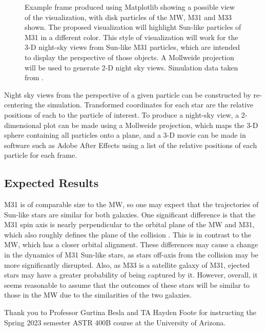 \documentclass[twocolumn]{aastex631}
\begin{document}
\begin{figure}[ht!]
\caption{Example frame produced using Matplotlib showing a possible view of the visualization, with disk particles of the MW, M31 and M33 shown. The proposed visualization will highlight Sun-like particles of M31 in a different color. This style of visualization will work for the 3-D night-sky views from Sun-like M31 particles, which are intended to display the perspective of those objects. A Mollweide projection will be used to generate 2-D night sky views. Simulation data taken from \citet{2012ApJ...753....9V}.
\label{fig2}}
\end{figure}

Night sky views from the perspective of a given particle can be constructed by re-centering the simulation. Transformed coordinates for each star are the relative positions of each to the particle of interest. To produce a night-sky view, a 2-dimensional plot can be made using a Mollweide projection, which maps the 3-D sphere containing all particles onto a plane, and a 3-D movie can be made in software such as Adobe After Effects using a list of the relative positions of each particle for each frame. 

\subsection{Expected Results}
M31 is of comparable size to the MW, so one may expect that the trajectories of Sun-like stars are similar for both galaxies. One significant difference is that the M31 spin axis is nearly perpendicular to the orbital plane of the MW and M31, which also roughly defines the plane of the collision \citep{2012ApJ...753....9V}. This is in contrast to the MW, which has a closer orbital alignment. These differences may cause a change in the dynamics of M31 Sun-like stars, as stars off-axis from the collision may be more significantly disrupted. Also, as M33 is a satellite galaxy of M31, ejected stars may have a greater probability of being captured by it. However, overall, it seems reasonable to assume that the outcomes of these stars will be similar to those in the MW due to the similarities of the two galaxies.

\begin{acknowledgments}
Thank you to Professor Gurtina Besla and TA Hayden Foote for instructing the Spring 2023 semester ASTR 400B course at the University of Arizona.
\end{acknowledgments}

{}

\end{document}

